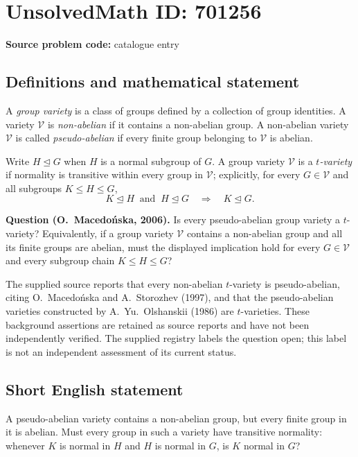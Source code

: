 \documentclass[11pt]{article}
\begin{document}
\section*{UnsolvedMath ID: 701256}
\textbf{Source problem code:} catalogue entry
\subsection{Definitions and mathematical statement}
A \emph{group variety} is a class of groups defined by a collection of group identities. A variety \(\mathcal V\) is \emph{non-abelian} if it contains a non-abelian group. A non-abelian variety \(\mathcal V\) is called \emph{pseudo-abelian} if every finite group belonging to \(\mathcal V\) is abelian.

Write \(H\trianglelefteq G\) when \(H\) is a normal subgroup of \(G\). A group variety \(\mathcal V\) is a \emph{\(t\)-variety} if normality is transitive within every group in \(\mathcal V\); explicitly, for every \(G\in\mathcal V\) and all subgroups \(K\leq H\leq G\),
\[
K\trianglelefteq H\ \text{ and }\ H\trianglelefteq G
\quad\Longrightarrow\quad K\trianglelefteq G.
\]

\textbf{Question (O.~Macedo\'{n}ska, 2006).} Is every pseudo-abelian group variety a \(t\)-variety? Equivalently, if a group variety \(\mathcal V\) contains a non-abelian group and all its finite groups are abelian, must the displayed implication hold for every \(G\in\mathcal V\) and every subgroup chain \(K\leq H\leq G\)?

The supplied source reports that every non-abelian \(t\)-variety is pseudo-abelian, citing O.~Macedo\'{n}ska and A.~Storozhev (1997), and that the pseudo-abelian varieties constructed by A.~Yu.~Olshanskii (1986) are \(t\)-varieties. These background assertions are retained as source reports and have not been independently verified. The supplied registry labels the question open; this label is not an independent assessment of its current status.
\subsection{Short English statement}
A pseudo-abelian variety contains a non-abelian group, but every finite group in it is abelian. Must every group in such a variety have transitive normality: whenever \(K\) is normal in \(H\) and \(H\) is normal in \(G\), is \(K\) normal in \(G\)?
\end{document}
